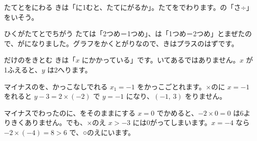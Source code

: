 \label{bk:3-5:tsuma}

\begin{tsumazuki}{たてとをにわる}
きは「に1むと、たてにがるか」。たてをでわります。の「さ÷」をいそう。
\end{tsumazuki}

\begin{tsumazuki}{ひくがたてとでちがう}
たては「2つめ－1つめ」、は「1つめ－2つめ」とまぜたので、がになりました。グラフをかくとがりなので、きはプラスのはずです。
\end{tsumazuki}

\begin{tsumazuki}{だけのをきとむ}
きは「$x$ にかかっている」です。いてあるではありません。$x$ が1ふえると、$y$ は2へります。
\end{tsumazuki}

\begin{tsumazuki}{マイナスのを、かっこなしでれる}
$x_1=-1$ をかっこごとれます。×のに $x=-1$ をれると $y-3=2\times(-2)$ で $y=-1$ になり、$(-1,\ 3)$ をりません。
\end{tsumazuki}

\begin{tsumazuki}{マイナスでわったのに、をそのままにする}
$x=0$ でかめると、$-2\times0=0$ は6よりきくありません。でも、×のえ $x>-3$ には0がってしまいます。$x=-4$ なら $-2\times(-4)=8>6$ で、○のえにいます。
\end{tsumazuki}

